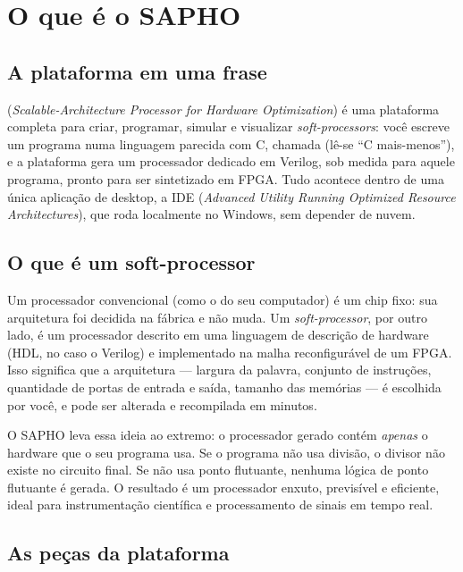 \chapter{O que é o SAPHO}
\label{cap:o-que-e-sapho}

\section{A plataforma em uma frase}

 (\emph{Scalable-Architecture Processor for Hardware Optimization}) é uma plataforma completa para criar, programar, simular e visualizar \emph{soft-processors}: você escreve um programa numa linguagem parecida com C, chamada \cmm{} (lê-se \enquote{C mais-menos}), e a plataforma gera um processador dedicado em Verilog, sob medida para aquele programa, pronto para ser sintetizado em FPGA. Tudo acontece dentro de uma única aplicação de desktop, a IDE  (\emph{Advanced Utility Running Optimized Resource Architectures}), que roda localmente no Windows, sem depender de nuvem.

\section{O que é um soft-processor}

Um processador convencional (como o do seu computador) é um chip fixo: sua arquitetura foi decidida na fábrica e não muda. Um \emph{soft-processor}, por outro lado, é um processador descrito em uma linguagem de descrição de hardware (HDL, no caso o Verilog) e implementado na malha reconfigurável de um FPGA. Isso significa que a arquitetura --- largura da palavra, conjunto de instruções, quantidade de portas de entrada e saída, tamanho das memórias --- é escolhida por você, e pode ser alterada e recompilada em minutos.

O SAPHO leva essa ideia ao extremo: o processador gerado contém \emph{apenas} o hardware que o seu programa usa. Se o programa não usa divisão, o divisor não existe no circuito final. Se não usa ponto flutuante, nenhuma lógica de ponto flutuante é gerada. O resultado é um processador enxuto, previsível e eficiente, ideal para instrumentação científica e processamento de sinais em tempo real.

\section{As peças da plataforma}
\label{sec:pecas-da-plataforma}

